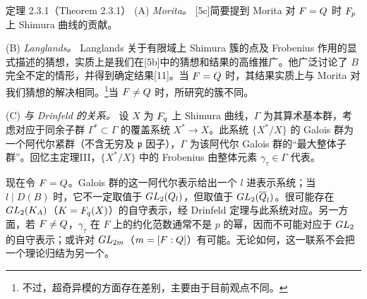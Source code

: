 \begin{originaltheorem}{定理 2.3.1（Theorem 2.3.1）}
(A) \emph{Morita。} [5c]简要提到 Morita 对 $F=Q$ 时 $F_p$ 上 Shimura 曲线的贡献。

(B) \emph{Langlands。} Langlands 关于有限域上 Shimura 簇的点及 Frobenius 作用的显式描述的猜想，实质上是我们在[5b]中的猜想和结果的高维推广。他广泛讨论了 $B$ 完全不定的情形，并得到确定结果[11]。当 $F=Q$ 时，其结果实质上与 Morita 对我们猜想的解决相同。\footnote{不过，超奇异模的方面存在差别，主要由于目前观点不同。}当 $F\ne Q$ 时，所研究的簇不同。

(C) \emph{与 Drinfeld 的关系。} 设 $X$ 为 $F_q$ 上 Shimura 曲线，$\Gamma$ 为其算术基本群，考虑对应于同余子群 $\Gamma^*\subset\Gamma$ 的覆盖系统 $X^*\longrightarrow X$。此系统 $\{X^*/X\}$ 的 Galois 群为一个阿代尔紧群（不含无穷及 $\mathfrak p$ 因子），$\Gamma$ 为该阿代尔 Galois 群的“最大整体子群”。回忆主定理III，$\{X^*/X\}$ 中的 Frobenius 由整体元素 $\gamma_\tau\in\Gamma$ 代表。

现在令 $F=Q$。Galois 群的这一阿代尔表示给出一个 $l$ 进表示系统；当 $l\mid D(B)$ 时，它不一定取值于 $GL_2(Q_l)$，但取值于 $GL_2(\overline{Q}_l)$。很可能存在 $GL_2(K_A)$（$K=F_q(X)$）的自守表示，经 Drinfeld 定理与此系统对应。另一方面，若 $F\ne Q$，$\gamma_\tau$ 在 $F$ 上的约化范数通常不是 $p$ 的幂，因而不可能对应于 $GL_2$ 的自守表示；或许对 $GL_{2m}$（$m=[F:Q]$）有可能。无论如何，这一联系不会把一个理论归结为另一个。


\end{originaltheorem}
